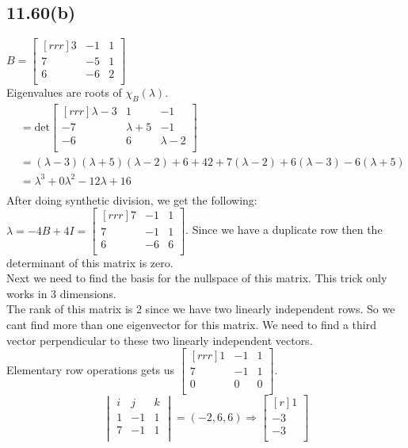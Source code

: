 \documentclass{report}
\theoremstyle{plain}
\theoremstyle{definition}
\theoremstyle{plain}
\begin{document}
\subsection{11.60(b)}
$B=\begin{bmatrix}[rrr]3&-1&1\\7&-5&1\\6&-6&2\\\end{bmatrix}$\\
Eigenvalues are roots of $\chi_B(\lambda)$.
\begin{align*}
&=\mathrm{det}\begin{bmatrix}[rrr]\lambda-3&1&-1\\-7&\lambda+5&-1\\-6&6&\lambda-2\\\end{bmatrix}\\
&=(\lambda-3)(\lambda+5)(\lambda-2)+6+42+7(\lambda-2)+6(\lambda-3)-6(\lambda+5)\\
&=\lambda^3+0\lambda^2-12\lambda+16\\
\end{align*}
After doing synthetic division, we get the following:
$\lambda=-4 B+4I=\begin{bmatrix}[rrr]7&-1&1\\7&-1&1\\6&-6&6\\\end{bmatrix}$. Since we have a duplicate row then the determinant of this matrix is zero.\\
Next we need to find the basis for the nullspace of this matrix. This trick only works in 3 dimensions.\\
The rank of this matrix is 2 since we have two linearly independent rows. So we cant find more than one eigenvector for this matrix. We need to find a third vector perpendicular to these two linearly independent vectors.\\
Elementary row operations gets us $\begin{bmatrix}[rrr]1&-1&1\\7&-1&1\\0&0&0\\\end{bmatrix}$.
\[ \begin{vmatrix}i&j&k\\1&-1&1\\7&-1&1\\\end{vmatrix} = (-2,6,6) \Rightarrow \begin{bmatrix}[r]1\\-3\\-3\\\end{bmatrix} \]
\end{document}
